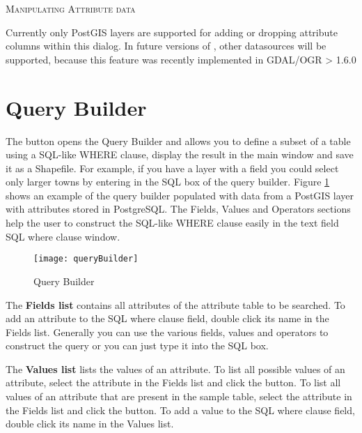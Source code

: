 \begin{Tip}\caption{\textsc{Manipulating Attribute data}}
Currently only PostGIS layers are supported for adding or dropping
attribute columns within this dialog. In future versions of \qg, other
datasources will be supported, because this feature was recently implemented
in GDAL/OGR > 1.6.0
\end{Tip}

\section{Query Builder}\label{sec:query_builder}

The  button opens the Query Builder and allows you to 
define a subset of a table using a SQL-like WHERE clause, display the result in the 
main window and save it as a Shapefile. For example, if you have a 
 layer 
with a  field you could select only larger towns by entering
 in the SQL box of the query builder. Figure
\ref{fig:query_builder} shows an example of the query builder populated with
data from a PostGIS layer with attributes stored in PostgreSQL. 
The Fields, Values and Operators sections help the user to construct the SQL-like
WHERE clause easily in the text field SQL where clause window.


\begin{figure}[ht]
  \centering
    \texttt{[image: queryBuilder]}
    \caption{Query Builder \nixcaption}\label{fig:query_builder}
\end{figure}

The \textbf{Fields list} contains all attributes of the attribute table to be 
searched. To add an attribute to the SQL where clause field, double click its 
name in the Fields list. Generally you can use the various fields, values and 
operators to construct the query or you can just type it into the SQL box. 

The \textbf{Values list} lists the values of an attribute. To list all possible 
values of an attribute, select the attribute in the Fields list and click the 
 button. To list all values 
of an attribute that are present in the sample table, select the attribute in 
the Fields list and click the  
button. To add a value to the SQL 
where clause field, double click its name in the Values list.   

